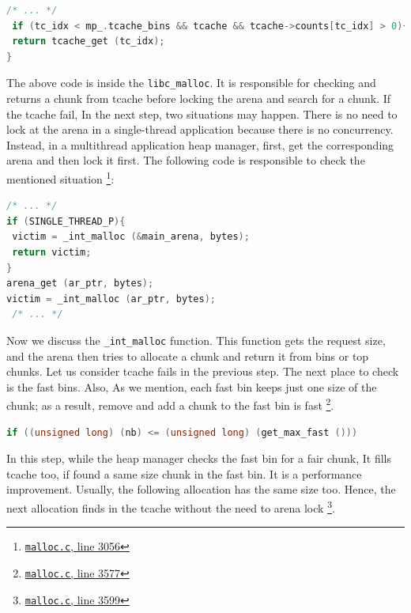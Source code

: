 \documentclass{masterthesis}
\newcommand*\tch{tcache}
\newcommand*\fb{fast bins}
\begin{document}
\begin{lstlisting}[language=c,frame=tlrb]
 /* ... */
 if (tc_idx < mp_.tcache_bins && tcache && tcache->counts[tc_idx] > 0){
 return tcache_get (tc_idx);
}
\end{lstlisting}

The above code is inside the \lstinline{libc_malloc}. It is responsible for checking and returns a chunk from \tch{} before locking the arena and search for a chunk. If the \tch{} fail, In the next step, two situations may happen. There is no need to lock at the arena in a single-thread application because there is no concurrency. Instead, in a multi\-thread application heap manager, first, get the corresponding arena and then lock it first. The following code is responsible to check the mentioned situation \footnote{\href{https://sourceware.org/git/?p=glibc.git;a=blob;f=malloc/malloc.c;h=f7cd29bc2f93e1082ee77800bd64a4b2a2897055;hb=9ea3686266dca3f004ba874745a4087a89682617\#l3056}{\texttt{malloc.c}, line 3056}}:

\begin{lstlisting}[language=c,frame=tlrb]
 /* ... */
if (SINGLE_THREAD_P){
 victim = _int_malloc (&main_arena, bytes);
 return victim;
}
arena_get (ar_ptr, bytes);
victim = _int_malloc (ar_ptr, bytes);
 /* ... */
\end{lstlisting}

Now we discuss the \lstinline{_int_malloc} function. This function gets the request size, and the arena then tries to allocate a chunk and return it from bins or top chunks. Let us consider \tch{} fails in the previous step. The next place to check is the \fb{}. Also, As we mention, each fast bin keeps just one size of the chunk; as a result, remove and add a chunk to the fast bin is fast \footnote{\href{https://sourceware.org/git/?p=glibc.git;a=blob;f=malloc/malloc.c;h=f7cd29bc2f93e1082ee77800bd64a4b2a2897055;hb=9ea3686266dca3f004ba874745a4087a89682617\#l3577}{\texttt{malloc.c}, line 3577}}.

\begin{lstlisting}[language=c,frame=tlrb]
if ((unsigned long) (nb) <= (unsigned long) (get_max_fast ()))
\end{lstlisting}

In this step, while the heap manager checks the fast bin for a fair chunk, It fills \tch{} too, if found a same size chunk in the fast bin. It is a performance improvement. Usually, the following allocation has the same size too. Hence, the next allocation finds in the \tch{} without the need to arena lock \footnote{\href{https://sourceware.org/git/?p=glibc.git;a=blob;f=malloc/malloc.c;h=f7cd29bc2f93e1082ee77800bd64a4b2a2897055;hb=9ea3686266dca3f004ba874745a4087a89682617\#l3599}{\texttt{malloc.c}, line 3599}}.
\end{document}
